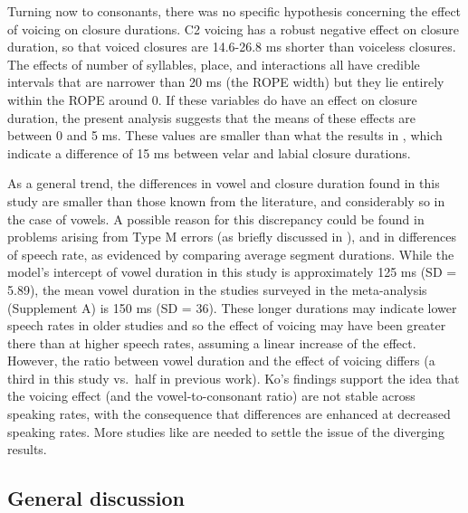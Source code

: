 \documentclass[
  12pt,
  a4paper,
]{article}
\begin{document}
Turning now to consonants, there was no specific hypothesis concerning
the effect of voicing on closure durations. C2 voicing has a robust
negative effect on closure duration, so that voiced closures are
14.6-26.8 ms shorter than voiceless closures. The effects of number of
syllables, place, and interactions all have credible intervals that are
narrower than 20 ms (the ROPE width) but they lie entirely within the
ROPE around 0. If these variables do have an effect on closure duration,
the present analysis suggests that the means of these effects are
between 0 and 5 ms. These values are smaller than what the results in
\citet{sharf1962}, which indicate a difference of 15 ms between velar
and labial closure durations.

As a general trend, the differences in vowel and closure duration found
in this study are smaller than those known from the literature, and
considerably so in the case of vowels. A possible reason for this
discrepancy could be found in problems arising from Type M errors (as
briefly discussed in ), and in differences of speech rate,
as evidenced by comparing average segment durations. While the model's
intercept of vowel duration in this study is approximately 125 ms (SD =
5.89), the mean vowel duration in the studies surveyed in the
meta-analysis (Supplement A) is 150 ms (SD = 36). These longer durations
may indicate lower speech rates in older studies and so the effect of
voicing may have been greater there than at higher speech rates,
assuming a linear increase of the effect. However, the ratio between
vowel duration and the effect of voicing differs (a third in this study
vs.~half in previous work). Ko's findings \citeyear{ko2018} support the
idea that the voicing effect (and the vowel-to-consonant ratio) are not
stable across speaking rates, with the consequence that differences are
enhanced at decreased speaking rates. More studies like \citet{ko2018}
are needed to settle the issue of the diverging results.

\hypertarget{general-discussion}{%
\subsection{General discussion}\label{general-discussion}}

\label{s:gen-disc}
\end{document}
